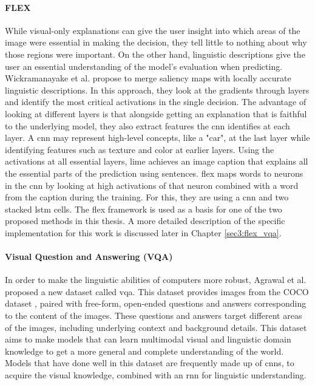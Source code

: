 \paragraph{FLEX\\}
While visual-only explanations can give the user insight into which areas of the image were essential in making the decision, they tell little to nothing about why those regions were important. On the other hand, linguistic descriptions give the user an essential understanding of the model's evaluation when predicting. 
Wickramanayake et al. \cite{wickramanayakeFLEXFaithfulLinguistic2019} propose  to merge saliency maps with locally accurate linguistic descriptions. In this approach, they look at the gradients through layers and identify the most critical activations in the single decision. The advantage of looking at different layers is that alongside getting an explanation that is faithful to the underlying model, they also extract features the \gls{cnn} identifies at each layer. A \gls{cnn} may represent high-level concepts, like a "car", at the last layer while identifying features such as texture and color at earlier layers. Using the activations at all essential layers, \gls{lime} achieves an image caption that explains all the essential parts of the prediction using sentences. \gls{flex} maps words to neurons in the \gls{cnn} by looking at high activations of that neuron combined with a word from the caption during the training. For this, they are using a \gls{cnn} and two stacked \gls{lstm} \cite{hochreiterLongShorttermMemory1997} cells.
The \gls{flex} framework is used as a basis for one of the two proposed methods in this thesis. A more detailed description of the specific implementation for this work is discussed later in Chapter \ref{sec3:flex_vqa}.

\paragraph{Visual Question and Answering (VQA)\\}
In order to make the linguistic abilities of computers more robust, Agrawal et al. \cite{agrawalVQAVisualQuestion2016} proposed a new dataset called \gls{vqa}. This dataset provides images from the COCO dataset \cite{linMicrosoftCOCOCommon2015}, paired with free-form, open-ended questions and answers corresponding to the content of the images. These questions and answers target different areas of the images, including underlying context and background details. This dataset aims to make models that can learn multimodal visual and linguistic domain knowledge to get a more general and complete understanding of the world. Models that have done well in this dataset are frequently made up of \glspl{cnn}, to acquire the visual knowledge, combined with an \gls{rnn} for linguistic understanding.

